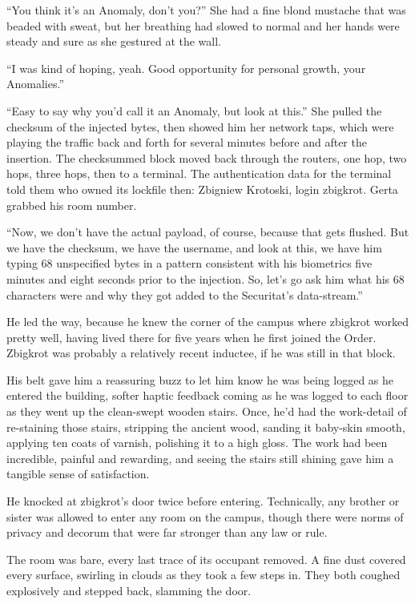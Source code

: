 “You think it's an Anomaly, don't you?” She had a fine blond 
mustache that was beaded with sweat, but her breathing had slowed to 
normal and her hands were steady and sure as she gestured at the wall.

“I was kind of hoping, yeah. Good opportunity for personal growth, 
your Anomalies.”

“Easy to say why you'd call it an Anomaly, but look at this.” She 
pulled the checksum of the injected bytes, then showed him her network 
taps, which were playing the traffic back and forth for several minutes 
before and after the insertion. The checksummed block moved back 
through the routers, one hop, two hops, three hops, then to a terminal. 
The authentication data for the terminal told them who owned its 
lockfile then: Zbigniew Krotoski, login zbigkrot. Gerta grabbed his 
room number.

“Now, we don't have the actual payload, of course, because that gets 
flushed. But we have the checksum, we have the username, and look at 
this, we have him typing 68 unspecified bytes in a pattern consistent 
with his biometrics five minutes and eight seconds prior to the 
injection. So, let's go ask him what his 68 characters were and why 
they got added to the Securitat's data-stream.”

He led the way, because he knew the corner of the campus where zbigkrot 
worked pretty well, having lived there for five years when he first 
joined the Order. Zbigkrot was probably a relatively recent inductee, 
if he was still in that block.

His belt gave him a reassuring buzz to let him know he was being logged 
as he entered the building, softer haptic feedback coming as he was 
logged to each floor as they went up the clean-swept wooden stairs. 
Once, he'd had the work-detail of re-staining those stairs, stripping 
the ancient wood, sanding it baby-skin smooth, applying ten coats of 
varnish, polishing it to a high gloss. The work had been incredible, 
painful and rewarding, and seeing the stairs still shining gave him a 
tangible sense of satisfaction.

He knocked at zbigkrot's door twice before entering. Technically, any 
brother or sister was allowed to enter any room on the campus, though 
there were norms of privacy and decorum that were far stronger than any 
law or rule.

The room was bare, every last trace of its occupant removed. A fine 
dust covered every surface, swirling in clouds as they took a few steps 
in. They both coughed explosively and stepped back, slamming the door.

